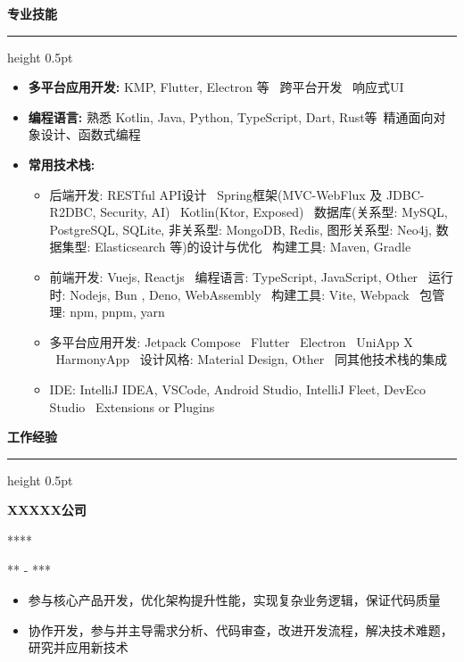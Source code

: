 \documentclass[11pt,a4paper]{article}
\renewcommand{\section}[1]{%
    \vspace{0.6em}%
    {\sffamily\Large\bfseries\color{sectioncolor}#1}%
    \vspace{0.2em}%
    \hrule height 0.5pt
    \vspace{0.4em}%
}
\newcommand{\company}[1]{%
    {\vspace{0.2em}\sffamily\textbf{\large#1}}%
}
\newcommand{\position}[2]{%
    \vspace{0.1em}  %
    \role{#1}\hfill\role{#2}%
    \vspace{0.2em}  %
}
\newcommand{\role}[1]{{\sffamily\color{graytext}\small#1}}
\newcommand{\daterange}[1]{\hfill{\sffamily\color{graytext}\small#1}}
\newcommand{\skill}[1]{\textbf{#1}}
\newcommand{\separator}{\textbullet~}  %
\begin{document}
\section{专业技能}
\begin{itemize}
    \item \skill{多平台应用开发:} KMP, Flutter, Electron 等 \separator 跨平台开发 \separator 响应式UI
    \item \skill{编程语言:} 熟悉 Kotlin, Java, Python, TypeScript, Dart, Rust等\separator 精通面向对象设计、函数式编程
    \item \skill{常用技术栈:}
        \begin{itemize}
            \sloppy
            \item 后端开发: RESTful API设计 \separator Spring框架(MVC-WebFlux 及 JDBC-R2DBC, Security, AI) \allowbreak \separator Kotlin(Ktor, Exposed) \separator 数据库(关系型: MySQL, PostgreSQL, SQLite, 非关系型: MongoDB, Redis, 图形关系型: Neo4j, 数据集型: Elasticsearch 等)的设计与优化 \allowbreak \separator 构建工具: Maven, Gradle
            \item 前端开发: Vuejs, Reactjs \separator 编程语言: TypeScript, JavaScript, Other \separator 运行时: Nodejs, Bun , Deno, WebAssembly \separator 构建工具: Vite, Webpack \separator 包管理: npm, pnpm, yarn
            \item 多平台应用开发: Jetpack Compose \separator Flutter \separator Electron \separator UniApp X \separator HarmonyApp \separator 设计风格: Material Design, Other \separator 同其他技术栈的集成
            \item IDE: IntelliJ IDEA, VSCode, Android Studio, IntelliJ Fleet, DevEco Studio \separator Extensions or Plugins
        \end{itemize}
\end{itemize}

\section{工作经验}
\company{XXXXX公司} 
\position{***}{***}
\daterange{*** - ***}
\begin{itemize}
    \item 参与核心产品开发，优化架构提升性能，实现复杂业务逻辑，保证代码质量
    \item 协作开发，参与并主导需求分析、代码审查，改进开发流程，解决技术难题，研究并应用新技术
\end{itemize}
\end{document}
